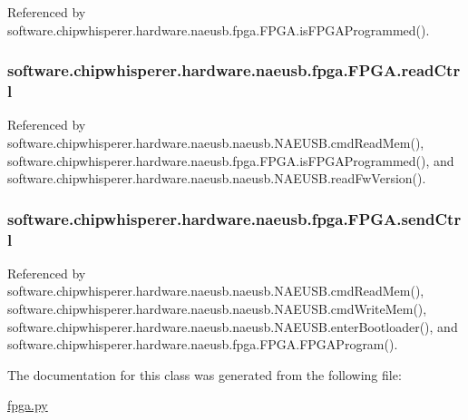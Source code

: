 Referenced by software.\+chipwhisperer.\+hardware.\+naeusb.\+fpga.\+F\+P\+G\+A.\+is\+F\+P\+G\+A\+Programmed().

\hypertarget{classsoftware_1_1chipwhisperer_1_1hardware_1_1naeusb_1_1fpga_1_1FPGA_a2ab1f3bccc19ecf43b8f96907a0c88e5}{}
\subsubsection[{read\+Ctrl}]{\setlength{\rightskip}{0pt plus 5cm}software.\+chipwhisperer.\+hardware.\+naeusb.\+fpga.\+F\+P\+G\+A.\+read\+Ctrl}\label{classsoftware_1_1chipwhisperer_1_1hardware_1_1naeusb_1_1fpga_1_1FPGA_a2ab1f3bccc19ecf43b8f96907a0c88e5}


Referenced by software.\+chipwhisperer.\+hardware.\+naeusb.\+naeusb.\+N\+A\+E\+U\+S\+B.\+cmd\+Read\+Mem(), software.\+chipwhisperer.\+hardware.\+naeusb.\+fpga.\+F\+P\+G\+A.\+is\+F\+P\+G\+A\+Programmed(), and software.\+chipwhisperer.\+hardware.\+naeusb.\+naeusb.\+N\+A\+E\+U\+S\+B.\+read\+Fw\+Version().

\hypertarget{classsoftware_1_1chipwhisperer_1_1hardware_1_1naeusb_1_1fpga_1_1FPGA_a18dce2e9b27a4e1dbafe37295bc7ba87}{}
\subsubsection[{send\+Ctrl}]{\setlength{\rightskip}{0pt plus 5cm}software.\+chipwhisperer.\+hardware.\+naeusb.\+fpga.\+F\+P\+G\+A.\+send\+Ctrl}\label{classsoftware_1_1chipwhisperer_1_1hardware_1_1naeusb_1_1fpga_1_1FPGA_a18dce2e9b27a4e1dbafe37295bc7ba87}


Referenced by software.\+chipwhisperer.\+hardware.\+naeusb.\+naeusb.\+N\+A\+E\+U\+S\+B.\+cmd\+Read\+Mem(), software.\+chipwhisperer.\+hardware.\+naeusb.\+naeusb.\+N\+A\+E\+U\+S\+B.\+cmd\+Write\+Mem(), software.\+chipwhisperer.\+hardware.\+naeusb.\+naeusb.\+N\+A\+E\+U\+S\+B.\+enter\+Bootloader(), and software.\+chipwhisperer.\+hardware.\+naeusb.\+fpga.\+F\+P\+G\+A.\+F\+P\+G\+A\+Program().



The documentation for this class was generated from the following file\+:\begin{DoxyCompactItemize}
\item 
\hyperlink{fpga_8py}{fpga.\+py}\end{DoxyCompactItemize}
